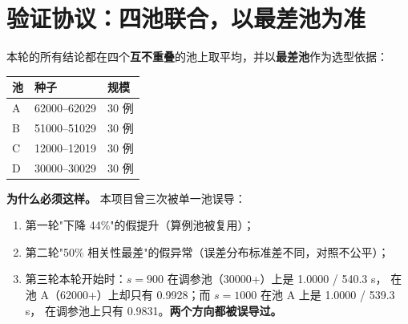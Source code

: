 \begin{abstract}
\textbf{（四）混合策略的真正答案。} 论文配置的 24 个站位里有 17 个是认证搜索补出来的，
而认证搜索把站位放到"证书最弱"处——\textbf{那正是定向源可能藏身之处}。
换句话说认证搜索兼任了定向源发现器，这是它真正的价值。
把认证搜索去掉换成"更密的纯格点扫描"，时间确实降到 533.8 s，
但最差完成率从 0.9978 掉到 0.9833（120 例中 14 例失败）。
加贴边环（6$\sim$16 站）只能把最差补到 0.9905，代价是时间回到 583 s。

\textbf{最终结论（诚实版）}：在\textbf{完成度完整}的前提下，本轮把"漏源"从 3 个压到 1 个、
时间基本持平；而\textbf{"完成度完整"与"时间大幅压缩"没有同时达成}——
这是一个真实的前沿：约 880 s 对应 0.9978，约 534 s 对应 0.9833。
本报告给出完整前沿与每一项尝试的判定，供权衡。
\end{abstract}

\tableofcontents
\newpage

\section{验证协议：四池联合，以最差池为准}

本轮的所有结论都在四个\textbf{互不重叠}的池上取平均，并以\textbf{最差池}作为选型依据：

\begin{center}
\begin{tabular}{lll}
\toprule
池 & 种子 & 规模 \\ \midrule
A & 62000--62029 & 30 例 \\
B & 51000--51029 & 30 例 \\
C & 12000--12019 & 30 例 \\
D & 30000--30029 & 30 例 \\
\bottomrule
\end{tabular}
\end{center}

\textbf{为什么必须这样。} 本项目曾三次被单一池误导：

\begin{enumerate}[leftmargin=1.8em]
  \item 第一轮"下降 44\%"的假提升（算例池被复用）；
  \item 第二轮"50\% 相关性最差"的假异常（误差分布标准差不同，对照不公平）；
  \item 第三轮本轮开始时：$s=900$ 在调参池（30000+）上是 1.0000 / 540.3 s，
        在池 A（62000+）上却只有 0.9928；而 $s=1000$ 在池 A 上是 1.0000 / 539.3 s，
        在调参池上只有 0.9831。\textbf{两个方向都被误导过。}
\end{enumerate}

